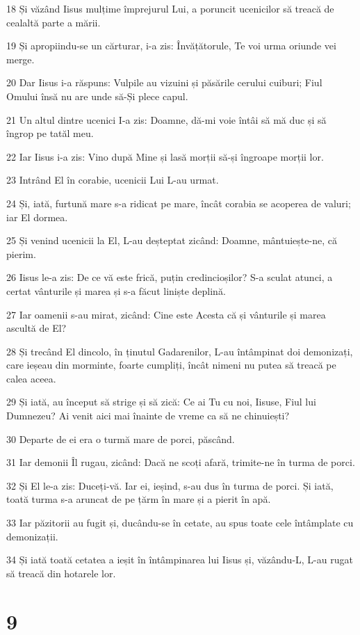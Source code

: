 \par 18 Și văzând Iisus mulțime împrejurul Lui, a poruncit ucenicilor să treacă de cealaltă parte a mării.
\par 19 Și apropiindu-se un cărturar, i-a zis: Învățătorule, Te voi urma oriunde vei merge.
\par 20 Dar Iisus i-a răspuns: Vulpile au vizuini și păsările cerului cuiburi; Fiul Omului însă nu are unde să-Și plece capul.
\par 21 Un altul dintre ucenici I-a zis: Doamne, dă-mi voie întâi să mă duc și să îngrop pe tatăl meu.
\par 22 Iar Iisus i-a zis: Vino după Mine și lasă morții să-și îngroape morții lor.
\par 23 Intrând El în corabie, ucenicii Lui L-au urmat.
\par 24 Și, iată, furtună mare s-a ridicat pe mare, încât corabia se acoperea de valuri; iar El dormea.
\par 25 Și venind ucenicii la El, L-au deșteptat zicând: Doamne, mântuiește-ne, că pierim.
\par 26 Iisus le-a zis: De ce vă este frică, puțin credincioșilor? S-a sculat atunci, a certat vânturile și marea și s-a făcut liniște deplină.
\par 27 Iar oamenii s-au mirat, zicând: Cine este Acesta că și vânturile și marea ascultă de El?
\par 28 Și trecând El dincolo, în ținutul Gadarenilor, L-au întâmpinat doi demonizați, care ieșeau din morminte, foarte cumpliți, încât nimeni nu putea să treacă pe calea aceea.
\par 29 Și iată, au început să strige și să zică: Ce ai Tu cu noi, Iisuse, Fiul lui Dumnezeu? Ai venit aici mai înainte de vreme ca să ne chinuiești?
\par 30 Departe de ei era o turmă mare de porci, păscând.
\par 31 Iar demonii Îl rugau, zicând: Dacă ne scoți afară, trimite-ne în turma de porci.
\par 32 Și El le-a zis: Duceți-vă. Iar ei, ieșind, s-au dus în turma de porci. Și iată, toată turma s-a aruncat de pe țărm în mare și a pierit în apă.
\par 33 Iar păzitorii au fugit și, ducându-se în cetate, au spus toate cele întâmplate cu demonizații.
\par 34 Și iată toată cetatea a ieșit în întâmpinarea lui Iisus și, văzându-L, L-au rugat să treacă din hotarele lor.

\chapter{9}

